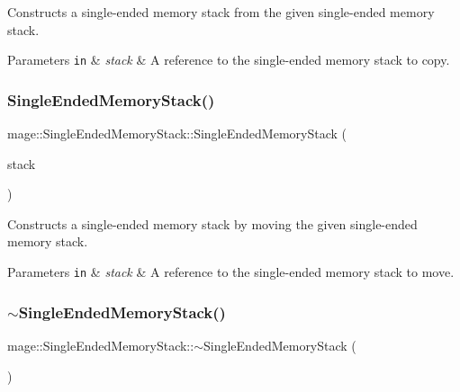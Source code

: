 Constructs a single-\/ended memory stack from the given single-\/ended memory stack.


\begin{DoxyParams}[1]{Parameters}
\mbox{\tt in}  & {\em stack} & A reference to the single-\/ended memory stack to copy. \\
\hline
\end{DoxyParams}
\hypertarget{classmage_1_1_single_ended_memory_stack_a4b62040c62ede5225373c3552857e3e8}{}\label{classmage_1_1_single_ended_memory_stack_a4b62040c62ede5225373c3552857e3e8} 
\subsubsection{\texorpdfstring{Single\+Ended\+Memory\+Stack()}{SingleEndedMemoryStack()}\hspace{0.1cm}{\footnotesize\ttfamily [3/3]}}
{\footnotesize\ttfamily mage\+::\+Single\+Ended\+Memory\+Stack\+::\+Single\+Ended\+Memory\+Stack (\begin{DoxyParamCaption}\item[{\hyperlink{classmage_1_1_single_ended_memory_stack}{Single\+Ended\+Memory\+Stack} \&\&}]{stack }\end{DoxyParamCaption})\hspace{0.3cm}{\ttfamily [default]}}

Constructs a single-\/ended memory stack by moving the given single-\/ended memory stack.


\begin{DoxyParams}[1]{Parameters}
\mbox{\tt in}  & {\em stack} & A reference to the single-\/ended memory stack to move. \\
\hline
\end{DoxyParams}
\hypertarget{classmage_1_1_single_ended_memory_stack_adaa82d19a1ef60ca42396bdaaea0c8e6}{}\label{classmage_1_1_single_ended_memory_stack_adaa82d19a1ef60ca42396bdaaea0c8e6} 
\subsubsection{\texorpdfstring{$\sim$\+Single\+Ended\+Memory\+Stack()}{~SingleEndedMemoryStack()}}
{\footnotesize\ttfamily mage\+::\+Single\+Ended\+Memory\+Stack\+::$\sim$\+Single\+Ended\+Memory\+Stack (\begin{DoxyParamCaption}{ }\end{DoxyParamCaption})}

